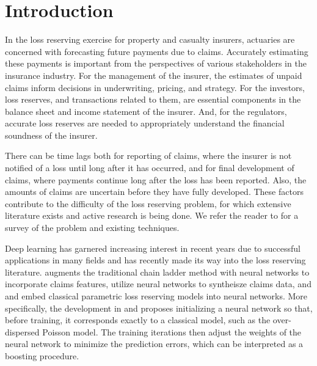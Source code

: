 \documentclass[risks,article,submit,moreauthors,pdftex]{mdpi}
\begin{document}

\hypertarget{introduction}{%
\section{Introduction}\label{introduction}}

In the loss reserving exercise for property and casualty insurers, actuaries are concerned with forecasting future payments due to claims. Accurately estimating these payments is important from the perspectives of various stakeholders in the insurance industry. For the management of the insurer, the estimates of unpaid claims inform decisions in underwriting, pricing, and strategy. For the investors, loss reserves, and transactions related to them, are essential components in the balance sheet and income statement of the insurer. And, for the regulators, accurate loss reserves are needed to appropriately understand the financial soundness of the insurer.

There can be time lags both for reporting of claims, where the insurer is not notified of a loss until long after it has occurred, and for final development of claims, where payments continue long after the loss has been reported. Also, the amounts of claims are uncertain before they have fully developed. These factors contribute to the difficulty of the loss reserving problem, for which extensive literature exists and active research is being done. We refer the reader to \citet{england2002stochastic} for a survey of the problem and existing techniques.

Deep learning has garnered increasing interest in recent years due to successful applications in many fields \citep{lecun2015deep} and has recently made its way into the loss reserving literature. \citet{wuthrich2018neural} augments the traditional chain ladder method with neural networks to incorporate claims features, \citet{gabrielli2018individual} utilize neural networks to syntheisze claims data, and \citet{gabrielli2018neural} and \citet{gabrielli2019neural} embed classical parametric loss reserving models into neural networks. More specifically, the development in \citet{gabrielli2018neural} and \citet{gabrielli2019neural} proposes initializing a neural network so that, before training, it corresponds exactly to a classical model, such as the over-dispersed Poisson model. The training iterations then adjust the weights of the neural network to minimize the prediction errors, which can be interpreted as a boosting procedure.
\end{document}
